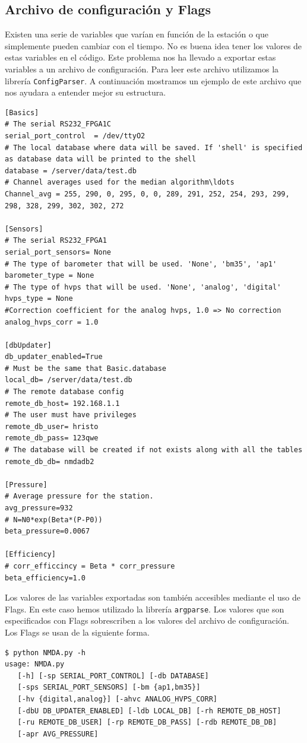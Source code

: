 	\subsection{Archivo de configuración y Flags}
		Existen una serie de variables que varían en función de la estación o que simplemente pueden cambiar con el tiempo. No es buena idea
		tener los valores de estas variables en el código. Este problema nos ha llevado a exportar estas variables a un archivo de configuración.
		Para leer este archivo utilizamos la librería \texttt{ConfigParser}\cite{py_ConfigParser}. A continuación mostramos un ejemplo de este
		archivo que nos ayudara a entender mejor su estructura.
		\begin{lstlisting}[style=myFile]
[Basics]
# The serial RS232_FPGA1C
serial_port_control  = /dev/ttyO2
# The local database where data will be saved. If 'shell' is specified as database data will be printed to the shell
database = /server/data/test.db
# Channel averages used for the median algorithm\ldots
Channel_avg = 255, 290, 0, 295, 0, 0, 289, 291, 252, 254, 293, 299, 298, 328, 299, 302, 302, 272

[Sensors]
# The serial RS232_FPGA1
serial_port_sensors= None
# The type of barometer that will be used. 'None', 'bm35', 'ap1'
barometer_type = None
# The type of hvps that will be used. 'None', 'analog', 'digital'
hvps_type = None
#Correction coefficient for the analog hvps, 1.0 => No correction
analog_hvps_corr = 1.0

[dbUpdater]
db_updater_enabled=True
# Must be the same that Basic.database
local_db= /server/data/test.db 
# The remote database config
remote_db_host= 192.168.1.1
# The user must have privileges
remote_db_user= hristo
remote_db_pass= 123qwe
# The database will be created if not exists along with all the tables
remote_db_db= nmdadb2

[Pressure]
# Average pressure for the station.
avg_pressure=932
# N=N0*exp(Beta*(P-P0))
beta_pressure=0.0067

[Efficiency]
# corr_efficcincy = Beta * corr_pressure
beta_efficiency=1.0
\end{lstlisting}
		Los valores de las variables exportadas son también accesibles mediante el uso de Flags. En este caso hemos utilizado la librería 
		\texttt{argparse}\cite{py_argparse}. Los valores que son especificados con Flags sobrescriben a los valores del archivo de
		configuración. Los Flags se usan de la siguiente forma.
		\begin{lstlisting}[style=myBash]
$ python NMDA.py -h
usage: NMDA.py 
   [-h] [-sp SERIAL_PORT_CONTROL] [-db DATABASE]
   [-sps SERIAL_PORT_SENSORS] [-bm {ap1,bm35}]
   [-hv {digital,analog}] [-ahvc ANALOG_HVPS_CORR]
   [-dbU DB_UPDATER_ENABLED] [-ldb LOCAL_DB] [-rh REMOTE_DB_HOST]
   [-ru REMOTE_DB_USER] [-rp REMOTE_DB_PASS] [-rdb REMOTE_DB_DB]
   [-apr AVG_PRESSURE]
		\end{lstlisting}

